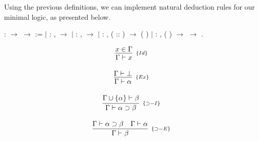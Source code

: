 Using the previous definitions, we can implement natural deduction rules for our minimal logic, as presented below.
\begin{coqdoccode}
\coqdocemptyline
\coqdocemptyline
\end{coqdoccode}
\begin{minipage}[c]{0.6\textwidth}
\begin{coqdoccode}
\coqdocnoindent
{}  : \coqdocvar{$\Gamma$} \ensuremath{\rightarrow} \coqdocvar{$\alpha$} \ensuremath{\rightarrow}  :=\coqdoceol
\coqdocnoindent
\ensuremath{|}  : \coqdockw{\ensuremath{\forall}}  ,\coqdoceol
\coqdocindent{2.00em}
   \ensuremath{\rightarrow}\coqdoceol
\coqdocindent{2.00em}
  \coqdoceol
\coqdocnoindent
\ensuremath{|}  : \coqdockw{\ensuremath{\forall}}  ,\coqdoceol
\coqdocindent{2.00em}
   \ensuremath{\rightarrow}\coqdoceol
\coqdocindent{2.00em}
  \coqdoceol
\coqdocnoindent
\ensuremath{|}  : \coqdockw{\ensuremath{\forall}}   ,\coqdoceol
\coqdocindent{2.00em}
 ( :: )  \ensuremath{\rightarrow}\coqdoceol
\coqdocindent{2.00em}
  (  )\coqdoceol
\coqdocnoindent
\ensuremath{|}  : \coqdockw{\ensuremath{\forall}}   ,\coqdoceol
\coqdocindent{2.00em}
  (  ) \ensuremath{\rightarrow}\coqdoceol
\coqdocindent{2.00em}
   \ensuremath{\rightarrow}\coqdoceol
\coqdocindent{2.00em}
  .\coqdoceol
\end{coqdoccode}
\end{minipage}
\begin{minipage}[c]{0.3\textwidth}
\[
\begin{array}{c}
\infer[_{\{Id\}}]{\Gamma \vdash x}{x \in \Gamma} \\ \\
\infer[_{\{Ex\}}]{\Gamma \vdash \alpha}{\Gamma \vdash \bot}\\ \\
\infer[_{\{\supset-I\}}]{\Gamma \vdash \alpha \supset \beta}{\Gamma \cup \{\alpha\} \vdash \beta}\\ \\
\infer[_{\{\supset-E\}}]{\Gamma \vdash \beta}{\Gamma \vdash \alpha \supset \beta & \Gamma \vdash \alpha}
\end{array}
\]
\end{minipage}


